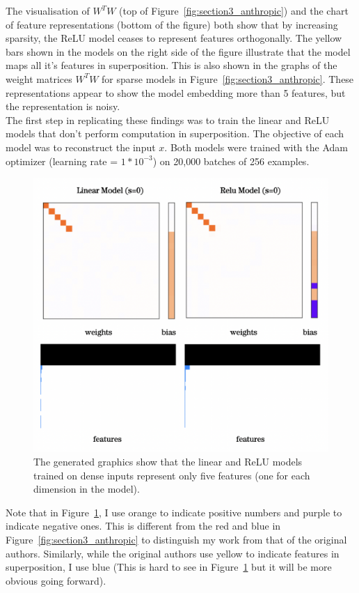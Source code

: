 \documentclass{article} %
\begin{document}
The visualisation of $W^{T}W$ (top of Figure~\ref{fig:section3_anthropic}) and the 
chart of feature representations (bottom of the figure) both show that by increasing sparsity, the 
ReLU model ceases to represent features orthogonally. The yellow bars shown in the models
on the right side of the figure illustrate that the model maps all it's features 
in superposition. This is also shown in the graphs of the weight matrices $W^{T}W$ for
sparse models in Figure~\ref{fig:section3_anthropic}. These 
representations appear to show the model embedding more than 5 features, but 
the representation is noisy.\\ 

The first step in replicating these findings was to train the linear and ReLU
models that don't perform computation in superposition. The
objective of each model was to reconstruct the input $x$. Both 
models were trained with the Adam optimizer (learning rate = $1*10^{-3}$) on 
20,000 batches of 256 examples.

\begin{figure}[h]
    \centering
    \includegraphics[width=0.4\linewidth]{demonstrating_superposition/images/relu_linear_0_sparsity.png}
    \captionsetup{font=footnotesize, width=0.7\linewidth} %
    \caption{The generated graphics show that the linear and ReLU models trained on
    dense inputs represent only five features (one for each dimension in the model).}
    \label{fig:relu_linear_0}
\end{figure}

Note that in Figure~\ref{fig:relu_linear_0}, I use orange to indicate
positive numbers and purple to indicate negative ones. This is different from
the red and blue in Figure~\ref{fig:section3_anthropic} to distinguish my work 
from that of the original authors. Similarly, while the original authors use 
yellow to indicate features in superposition, I use blue (This is hard to see in 
Figure~\ref{fig:relu_linear_0} but it will be more obvious going forward).
\end{document}
